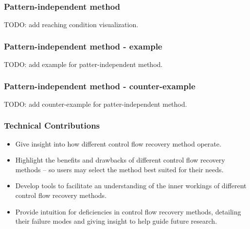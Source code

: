 \documentclass[aspectratio=1610]{beamer}
\begin{document}
\begin{frame}
	\frametitle{Pattern-independent method}
	TODO: add reaching condition visualization.

\end{frame}


\begin{frame}
	\frametitle{Pattern-independent method - example}

	TODO: add example for patter-independent method.
\end{frame}

\begin{frame}
	\frametitle{Pattern-independent method - counter-example}

	TODO: add counter-example for patter-independent method.
\end{frame}


\begin{frame}
	\frametitle{Technical Contributions}

	\begin{itemize}
		\item Give insight into how different control flow recovery method operate.
		\item Highlight the benefits and drawbacks of different control flow recovery methods -- so users may select the method best suited for their needs.
		\item Develop tools to facilitate an understanding of the inner workings of different control flow recovery methods.
		\item Provide intuition for deficiencies in control flow recovery methods, detailing their failure modes and giving insight to help guide future research.
	\end{itemize}


\end{frame}
\end{document}

